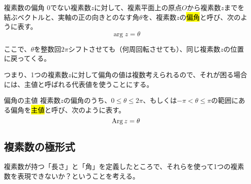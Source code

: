 \documentclass[../imaging-math]{subfiles}
\begin{document}
\begin{definition}{複素数の偏角}
  \titlegap
  $0$でない複素数$z$に対して、複素平面上の原点$O$から複素数$z$までを結ぶベクトルと、実軸の正の向きとのなす角$\theta$を、複素数$z$の\hl{偏角}と呼び、次のように表す。
  \LARGE
  \begin{equation}
    \arg z = \theta
  \end{equation}
\end{definition}

ここで、$\theta$を整数回$2\pi$シフトさせても（何周回転させても）、同じ複素数$z$の位置に戻ってくる。

つまり、1つの複素数$z$に対して偏角の値は複数考えられるので、それが困る場合には、主値と呼ばれる代表値を使うことにする。

\begin{definition}{偏角の主値}
  \titlegap
  複素数$z$の偏角のうち、$0\leq \theta \leq 2\pi$、もしくは$-\pi < \theta \leq \pi$の範囲にある偏角を\hl{主値}と呼び、次のように表す。
  \LARGE
  \begin{equation}
    \operatorname{Arg} z = \theta
  \end{equation}
\end{definition}

\subsection{複素数の極形式}

複素数が持つ「長さ」と「角」を定義したところで、それらを使って1つの複素数を表現できないか？ということを考える。
\end{document}
